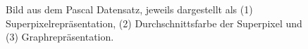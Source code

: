 \begin{figure}[t]
\centering
{}
\caption[\gls{Pascal}]{Bild aus dem \gls{Pascal} Datensatz, jeweils dargestellt als (1) Superpixelrepräsentation, (2) Durchschnittsfarbe der Superpixel und (3) Graphrepräsentation.}
\label{fig:pascal_voc}
\end{figure}
